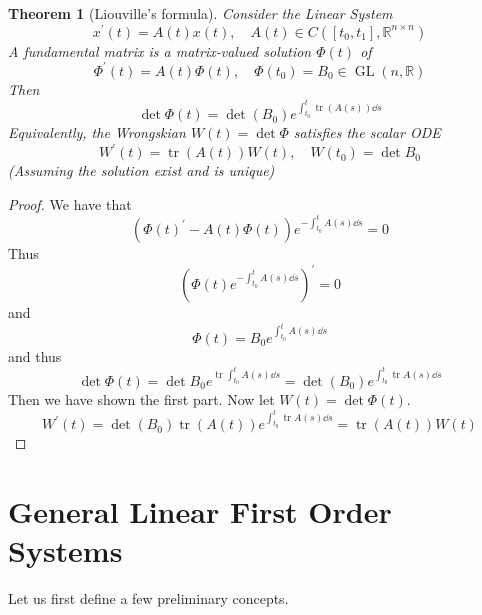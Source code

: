 \documentclass[a4paper, 12pt]{book}
\newtheorem{theorem}{Theorem}[chapter]
\begin{document}
\begin{theorem}
	[Liouville's formula]
	Consider the Linear System \[
		x^\prime(t)=A(t)x(t), \quad A(t)\in C([t_0,t_1], \mathbb{R}^{n\times n} )
	\]
	A fundamental matrix is a matrix-valued solution \( \Phi(t) \) of
	\[
		\Phi^\prime(t)=A(t)\Phi(t), \quad \Phi(t_0)=B_0\in \operatorname{GL}(n, \mathbb{R})
	\]
	Then \[
		\operatorname{det}\Phi(t)= \operatorname{det} (B_0) e^{\int_{t_0}^{t} \operatorname{tr} (A(s))\dd s}
	\]
	Equivalently, the Wrongskian \( W(t) = \operatorname{det}\Phi\) satisfies the scalar ODE \[
		W^\prime(t)= \operatorname{tr} (A(t)) W(t), \quad W(t_0)=\operatorname{det}B_0
	\]
	(Assuming the solution exist and is unique)
\end{theorem}
\begin{proof}
	We have that \[
		(\Phi(t)^\prime -A(t)\Phi(t)) e^{-\int_{t_0}^{t} A(s) \dd s }=0
	\]
	Thus \[
		(\Phi(t)e^{-\int_{t_0}^{t} A(s)\dd s}) ^\prime=0
	\]
	and \[
		\Phi(t)=B_0 e^{\int_{t_0}^{t} A(s) \dd s}
	\]
	and thus \[
		\operatorname{det}\Phi(t)= \operatorname{det}B_0 e^{\operatorname{tr} \int_{t_0}^{t} A(s) \dd s} = \operatorname{det}(B_0) e^{\int_{t_0}^{t} \operatorname{tr} A(s) \dd s}
	\]
	Then we have shown the first part. Now let \( W(t)= \operatorname{det}\Phi(t) \). \[
		W^\prime(t)=\operatorname{det}(B_0) \operatorname{tr} (A(t)) e^{\int_{t_0}^{t} \operatorname{tr} A(s) \dd s } = \operatorname{tr} (A(t)) W(t)
	\]
\end{proof}
\section{General Linear First Order Systems}
Let us first define a few preliminary concepts.\\
\end{document}
